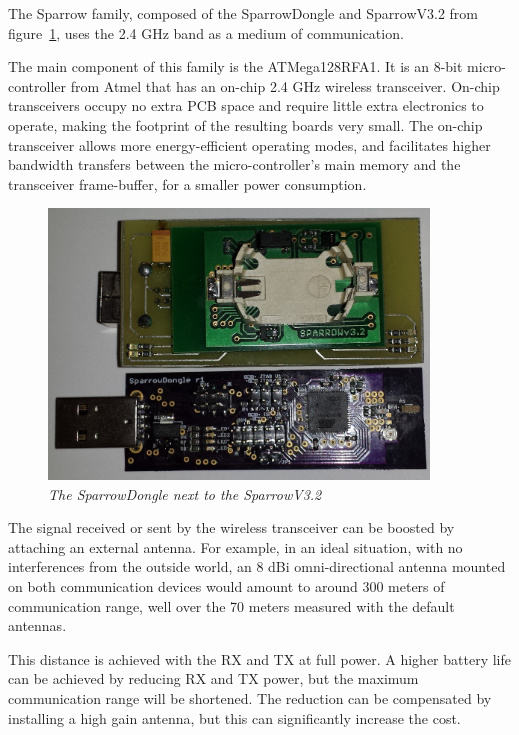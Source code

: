 The Sparrow family, composed of the SparrowDongle and SparrowV3.2 from figure~\ref{fig:sparrowfamily}, uses the 2.4 GHz band as a medium of communication. 
 

The main component of this family is the ATMega128RFA1. It is an 8-bit micro-controller from Atmel that has an on-chip 2.4 GHz wireless transceiver. On-chip transceivers occupy no extra PCB space and require little extra electronics to operate, making the footprint of the resulting boards very small. The on-chip transceiver allows more energy-efficient operating modes, and facilitates higher bandwidth transfers between the micro-controller's main memory and the transceiver frame-buffer, for a smaller power consumption.

\begin{figure}[ht]
\begin{center}
\includegraphics[width=0.9\textwidth]{img/sparrow.jpg}
\end{center}
\caption{\small \itshape{The SparrowDongle next to the SparrowV3.2}}
  \label{fig:sparrowfamily}
\end{figure}

The signal received or sent by the wireless transceiver can be boosted by attaching an external antenna. For example, in an ideal situation, with no interferences from the outside world, an 8 dBi omni-directional antenna mounted on both communication devices would amount to around 300 meters of communication range, well over the 70 meters measured with the default antennas.

This distance is achieved with the RX and TX at full power. A higher battery life can be achieved by reducing RX and TX power, but the maximum communication range will be shortened. The reduction can be compensated by installing a high gain antenna, but this can significantly increase the cost.

